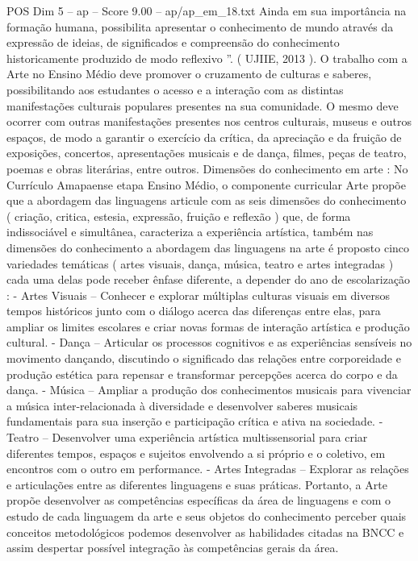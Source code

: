 \begin{textsample}{POS Dim 5 – ap – Score 9.00 – ap/ap\_em\_18.txt}
Ainda em sua importância na formação humana, possibilita apresentar o conhecimento de mundo através da expressão de ideias, de significados e compreensão do conhecimento historicamente produzido de modo reflexivo ”. ( UJIIE, 2013 ).
O trabalho com a Arte no Ensino Médio deve promover o cruzamento de culturas e saberes, possibilitando aos estudantes o acesso e a interação com as distintas manifestações culturais populares presentes na sua comunidade.
O mesmo deve ocorrer com outras manifestações presentes nos centros culturais, museus e outros espaços, de modo a garantir o exercício da crítica, da apreciação e da fruição de exposições, concertos, apresentações musicais e de dança, filmes, peças de teatro, poemas e obras literárias, entre outros.
Dimensões do conhecimento em arte : No Currículo Amapaense etapa Ensino Médio, o componente curricular Arte propõe que a abordagem das linguagens articule com as seis dimensões do conhecimento ( criação, critica, estesia, expressão, fruição e reflexão ) que, de forma indissociável e simultânea, caracteriza a experiência artística, também nas dimensões do conhecimento a abordagem das linguagens na arte é proposto cinco variedades temáticas ( artes visuais, dança, música, teatro e artes integradas ) cada uma delas pode receber ênfase diferente, a depender do ano de escolarização : - Artes Visuais – Conhecer e explorar múltiplas culturas visuais em diversos tempos históricos junto com o diálogo acerca das diferenças entre elas, para ampliar os limites escolares e criar novas formas de interação artística e produção cultural. - Dança – Articular os processos cognitivos e as experiências sensíveis no movimento dançando, discutindo o significado das relações entre corporeidade e produção estética para repensar e transformar percepções acerca do corpo e da dança. - Música – Ampliar a produção dos conhecimentos musicais para vivenciar a música inter-relacionada à diversidade e desenvolver saberes musicais fundamentais para sua inserção e participação crítica e ativa na sociedade. - Teatro – Desenvolver uma experiência artística multissensorial para criar diferentes tempos, espaços e sujeitos envolvendo a si próprio e o coletivo, em encontros com o outro em performance. - Artes Integradas – Explorar as relações e articulações entre as diferentes linguagens e suas práticas.
Portanto, a Arte propõe desenvolver as competências específicas da área de linguagens e com o estudo de cada linguagem da arte e seus objetos do conhecimento perceber quais conceitos metodológicos podemos desenvolver as habilidades citadas na BNCC e assim despertar possível integração às competências gerais da área.

\end{textsample}
